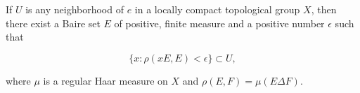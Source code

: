 If $U$ is any neighborhood of $e$ in a locally compact topological group $X$, then there exist a Baire set $E$ of positive, finite measure and a positive number $\epsilon$ such that

$$\{x: \rho(xE,E) < \epsilon\} \subset U,$$

where $\mu$ is a regular Haar measure on $X$ and $\rho(E,F) = \mu(E \Delta F)$.
